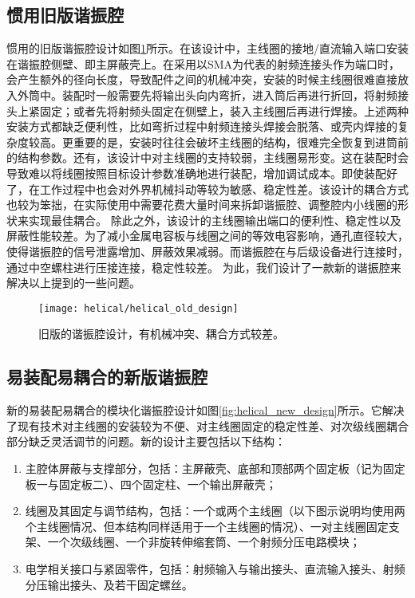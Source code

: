 \subsection[惯用旧版谐振腔]{惯用旧版谐振腔}
惯用的旧版谐振腔设计如图\ref{fig:helical_old_design}所示。在该设计中，主线圈的接地/直流输入端口安装在谐振腔侧壁、即主屏蔽壳上。在采用以SMA为代表的射频连接头作为端口时，会产生额外的径向长度，导致配件之间的机械冲突，安装的时候主线圈很难直接放入外筒中。装配时一般需要先将输出头向内弯折，进入筒后再进行折回，将射频接头上紧固定；或者先将射频头固定在侧壁上，装入主线圈后再进行焊接。上述两种安装方式都缺乏便利性，比如弯折过程中射频连接头焊接会脱落、或壳内焊接的复杂度较高。更重要的是，安装时往往会破坏主线圈的结构，很难完全恢复到进筒前的结构参数。还有，该设计中对主线圈的支持较弱，主线圈易形变。这在装配时会导致难以将线圈按照目标设计参数准确地进行装配，增加调试成本。即使装配好了，在工作过程中也会对外界机械抖动等较为敏感、稳定性差。该设计的耦合方式也较为笨拙，在实际使用中需要花费大量时间来拆卸谐振腔、调整腔内小线圈的形状来实现最佳耦合。
除此之外，该设计的主线圈输出端口的便利性、稳定性以及屏蔽性能较差。为了减小金属电容板与线圈之间的等效电容影响，通孔直径较大，使得谐振腔的信号泄露增加、屏蔽效果减弱。而谐振腔在与后级设备进行连接时，通过中空螺柱进行压接连接，稳定性较差。
为此，我们设计了一款新的谐振腔来解决以上提到的一些问题。

\begin{figure}
    \centering
    \caption[旧版的谐振腔设计]{旧版的谐振腔设计，有机械冲突、耦合方式较差。\label{fig:helical_old_design}}
    \texttt{[image: helical/helical\_old\_design]}
\end{figure}
\subsection[易装配易耦合的新版谐振腔]{易装配易耦合的新版谐振腔}
新的易装配易耦合的模块化谐振腔设计如图\ref{fig:helical_new_design}所示。它解决了现有技术对主线圈的安装较为不便、对主线圈固定的稳定性差、对次级线圈耦合部分缺乏灵活调节的问题。新的设计主要包括以下结构：
\begin{enumerate}
    \item 主腔体屏蔽与支撑部分，包括：主屏蔽壳、底部和顶部两个固定板（记为固定板一与固定板二）、四个固定柱、一个输出屏蔽壳；
    \item 线圈及其固定与调节结构，包括：一个或两个主线圈（以下图示说明均使用两个主线圈情况、但本结构同样适用于一个主线圈的情况）、一对主线圈固定支架、一个次级线圈、一个非旋转伸缩套筒、一个射频分压电路模块；
    \item 电学相关接口与紧固零件，包括：射频输入与输出接头、直流输入接头、射频分压输出接头、及若干固定螺丝。
\end{enumerate}

